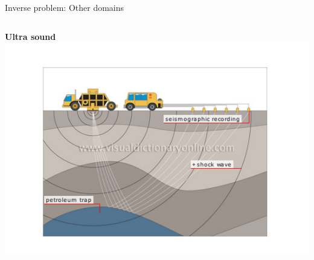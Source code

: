 \documentclass{beamer}
\begin{document}
\begin{frame}{Inverse problem: Other domains}

    
\begin{columns}[T]
    
     {\bf Ultra sound}\\
    \includegraphics[width=.7\textwidth, trim={6.7em 4em 7em 5em}, clip]{InverseProblem_petroleum}


\end{columns}
\end{frame}
\end{document}
